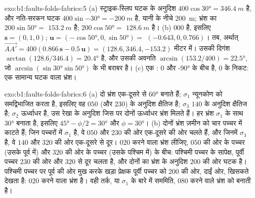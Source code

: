 \begin{solution}{exo:b1:faults-folds-fabrics:5}
(a) स्ट्राइक-स्लिप घटक  के अनुदिश $400\cos\ang{30} = \qty{346.4}{m}$ है, और नति-सरकन घटक
$400\sin\ang{-30} = \qty{-200}{m}$ है, यानी  के नीचे \qty{200}{m}; भ्रंश का  $200\sin\ang{50} =$ $\qty{153.2}{m}$ है;
 $200\cos\ang{50} =$ $\qty{128.6}{m}$ है। (b)  $000$ है, इसलिए $\mathbf s = (0, 1, 0)$; $\mathbf u = (-\cos\ang{50}, 0, \sin\ang{50}) =$
$(-0.643, 0, 0.766)$। तब, अर्थात्
$\overrightarrow{AA'} = 400(0.866\,\mathbf s - 0.5\,\mathbf u) =
(128.6, 346.4, -153.2)$ मीटर में। उसकी दिगंश $\arctan(128.6/346.4) =
\ang{20.4}$ है, और उसकी अवनति $\arcsin(153.2/400) = \ang{22.5}$, जो $\arcsin(\sin\ang{30}\sin\ang{50})$ के भी बराबर है। (c) एक :  $0$ और \ang{-90} के बीच है, $0$ के निकट: एक सामान्य घटक वाला  भ्रंश।
\end{solution}

\begin{solution}{exo:b1:faults-folds-fabrics:6}
(a) दो भ्रंश एक-दूसरे से \ang{60} बनाते हैं; $\sigma_1$ न्यूनकोण को समद्विभाजित करता है, इसलिए वह $050$ (और $230$) के अनुदिश क्षैतिज है; $\sigma_3$ $140$ के अनुदिश क्षैतिज है; $\sigma_2$ ऊर्ध्वाधर है, उस रेखा के अनुदिश जिस पर दोनों ऊर्ध्वाधर भ्रंश मिलते हैं। हर भ्रंश $\sigma_1$ के साथ \ang{30} बनाता है, इसलिए $\ang{45} - \phi/2 =
\ang{30}$ और $\phi = \ang{30}$। (b) दोनों भ्रंश ज़मीन को चार पच्चर में काटते हैं; जिन पच्चरों में $\sigma_1$ है, वे $050$ और $230$ की ओर एक-दूसरे की ओर चलते हैं, और जिनमें $\sigma_3$ है, वे $140$ और $320$ की ओर एक-दूसरे से दूर। $020$  करने वाला भ्रंश लीजिए, $050$ की ओर के पच्चर (उसके पूर्व में) और $320$ की ओर के पच्चर (उसके पश्चिम में) के बीच: पश्चिमी पच्चर के सापेक्ष, पूर्वी पच्चर $230$ की ओर और $320$ से दूर चलता है, और दोनों का भ्रंश के अनुदिश $200$ की ओर घटक है। पश्चिमी पच्चर पर पूर्व की ओर मुख करके खड़ा प्रेक्षक पूर्वी पच्चर को $200$ की ओर, दाईं ओर, खिसकते देखता है: $020$  करने वाला भ्रंश  है। वही तर्क, या $\sigma_1$ के बारे में सममिति, $080$  करने वाले भ्रंश को  बनाती है।
\end{solution}

